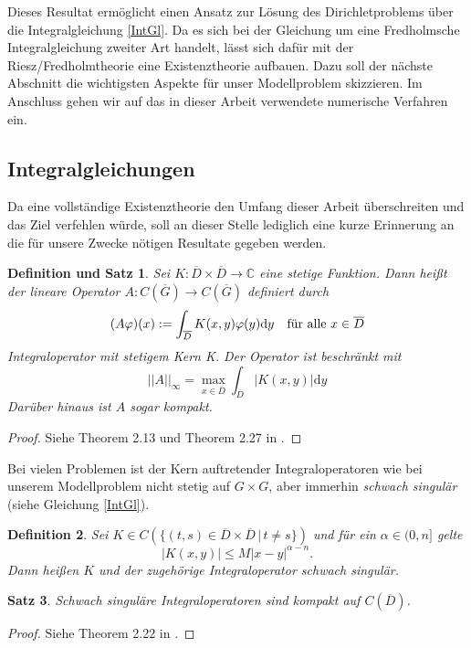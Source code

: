 \documentclass[12pt,a4paper]{scrartcl}
\newtheorem{Satz}{Satz}[section]
\newtheorem{Def}[Satz]{Definition}
\newtheorem{DefSatz}[Satz]{Definition und Satz}
\newcommand{\dd}{\mathrm{d}}
\numberwithin{equation}{section}
\newcommand{\C}{\mathbb{C}} %
\newcommand{\fa}{\text{\quad für alle }}
\begin{document}
Dieses Resultat ermöglicht einen Ansatz zur Lösung des Dirichletproblems über die Integralgleichung \eqref{IntGl}. Da es sich bei der Gleichung um eine Fredholmsche Integralgleichung zweiter Art handelt, lässt sich dafür mit der Riesz/Fredholmtheorie eine Existenztheorie aufbauen. Dazu soll der nächste Abschnitt die wichtigsten Aspekte für unser Modellproblem skizzieren.
Im Anschluss gehen wir auf das in dieser Arbeit verwendete numerische Verfahren ein.

\subsection{Integralgleichungen} \label{chaIntgl}
Da eine vollständige Existenztheorie den Umfang dieser Arbeit überschreiten und das Ziel verfehlen würde, soll an dieser Stelle lediglich eine kurze Erinnerung an die für unsere Zwecke nötigen Resultate gegeben werden. 
\begin{DefSatz} \label{SbeschrIntop}
Sei $ K : \overline D \times \overline D \to \C$ eine stetige Funktion. Dann heißt der  lineare Operator $A:C( \overline G) \to C( \overline G)$ definiert durch
\[
	(A \varphi)(x):= \int_{\overline D} K(x,y) \varphi (y) \dd y \fa x \in \overline{D}
\]
\emph{Integraloperator mit stetigem Kern K}. Der Operator ist beschränkt mit
\[
	||A||_\infty = \max_{x\in \overline D} \int_{\overline D} |K(x,y)| \dd y
\]
Darüber hinaus ist $A$ sogar kompakt.
\end{DefSatz}
\begin{proof}
Siehe Theorem 2.13 und Theorem 2.27 in \cite{kress}.


\end{proof}
Bei vielen Problemen ist der Kern auftretender Integraloperatoren wie bei unserem Modellproblem nicht stetig auf $G \times G$, aber immerhin \emph{schwach singulär} (siehe Gleichung \ref{IntGl}).
\begin{Def}
	Sei $K \in C(\{(t,s) \in \overline D \times \overline D \,|\, t \neq s\})$ und für ein $\alpha \in (0,n]$ gelte
\[
	|K(x,y)| \leq M |x - y|^{\alpha-n}. 
\]	
Dann heißen $K$ und der zugehörige Integraloperator \emph{schwach singulär}.
\end{Def}
\begin{Satz}
Schwach singuläre Integraloperatoren sind kompakt auf $C(\overline D)$.
\end{Satz}
\begin{proof}
Siehe Theorem 2.22 in \cite{kress}.
\end{proof}
\end{document}

